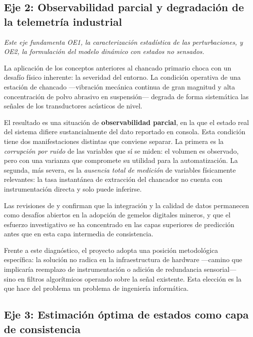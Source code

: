 \subsection{Eje 2: Observabilidad parcial y degradación de la telemetría
industrial}
\label{sec:marco-eje2}

\emph{Este eje fundamenta OE1, la caracterización estadística de las
perturbaciones, y OE2, la formulación del modelo dinámico con estados no
sensados.}

La aplicación de los conceptos anteriores al chancado primario choca con un
desafío físico inherente: la severidad del entorno. La condición operativa de
una estación de chancado —vibración mecánica continua de gran magnitud y alta
concentración de polvo abrasivo en suspensión— degrada de forma sistemática las
señales de los transductores acústicos de nivel.

El resultado es una situación de \textbf{observabilidad parcial}, en la que el
estado real del sistema difiere sustancialmente del dato reportado en consola.
Esta condición tiene dos manifestaciones distintas que conviene separar. La
primera es la \emph{corrupción por ruido} de las variables que sí se miden: el
volumen es observado, pero con una varianza que compromete su utilidad para la
automatización. La segunda, más severa, es la \emph{ausencia total de medición}
de variables físicamente relevantes: la tasa instantánea de extracción del
chancador no cuenta con instrumentación directa y solo puede inferirse.

Las revisiones de \textcite{qu2023} y \textcite{ebad2026} confirman que la
integración y la calidad de datos permanecen como desafíos abiertos en la
adopción de gemelos digitales mineros, y que el esfuerzo investigativo se ha
concentrado en las capas superiores de predicción antes que en esta capa
intermedia de consistencia.

Frente a este diagnóstico, el proyecto adopta una posición metodológica
específica: la solución no radica en la infraestructura de hardware —camino que
implicaría reemplazo de instrumentación o adición de redundancia sensorial—
sino en filtros algorítmicos operando sobre la señal existente. Esta elección es
la que hace del problema un problema de ingeniería informática.

\subsection{Eje 3: Estimación óptima de estados como capa de consistencia}
\label{sec:marco-eje3}

